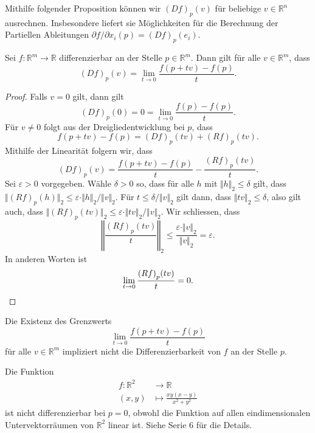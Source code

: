 \documentclass[../main.tex]{subfiles}
\begin{document}
Mithilfe folgender Proposition können wir ${(Df)}_p(v)$ 
für beliebige $v \in \mathbb{R}^n$ ausrechnen.
Insbesondere liefert sie Möglichkeiten für die
Berechnung der Partiellen Ableitungen
$\partial f / \partial x_i (p) = {(Df)}_p(e_i)$.

\begin{proposition*}
  Sei $f \colon \mathbb{R}^m \to \mathbb{R}$ differenzierbar
  an der Stelle $p \in \mathbb{R}^m$.
  Dann gilt für alle $v \in \mathbb{R}^m$, dass
  \[
    {(Df)}_p(v) = \lim_{t \to 0}
    \frac{f(p + tv) - f(p)}{t}.
  \]
\end{proposition*}

\begin{proof}
  Falls $v = 0$ gilt, dann gilt
  \[
    {(Df)}_p(0) = 0 = \lim_{t \to 0} \frac{f(p) - f(p)}{t}.
  \]
  Für $v \neq 0$ folgt aus der Dreigliedentwicklung
  bei $p$, dass
  \[
    f(p + tv) - f(p)
    = {(Df)}_p(tv) + {(Rf)}_p(tv).
  \]
  Mithilfe der Linearität folgern wir, dass
  \[
    {(Df)}_p(v) = \frac{f(p + tv) - f(p)}{t} - \frac{{(Rf)}_p(tv)}{t}.
  \]
  Sei $\varepsilon > 0$ vorgegeben. Wähle $\delta > 0$ 
  so, dass für alle $h$ mit $\Vert h \Vert_2 \leq \delta$ 
  gilt, dass $\Vert {(Rf)}_p(h) \Vert_2 \leq \varepsilon \cdot
  \Vert h \Vert_2 / \Vert v \Vert_2$.
  Für $t \leq \delta / \Vert v \Vert_2$ gilt dann,
  dass $\Vert tv \Vert_2 \leq \delta$,
  also gilt auch, dass
  $\Vert {(Rf)}_p (tv) \Vert_2 \leq \varepsilon 
  \cdot \Vert t v \Vert_2 /\Vert v \Vert_2$.
  Wir schliessen, dass
  \[
    \left\Vert \frac{{(Rf)}_p(tv)}{t} \right\Vert_2
    \leq \frac{\varepsilon \cdot \Vert v \Vert_2}{\Vert v \Vert_2} 
    = \varepsilon.
  \]
  In anderen Worten ist
  \[
    \lim_{t \to 0} \frac{{(Rf)}_p(tv)}{t} = 0. \qedhere
  \]
\end{proof}

\begin{remark}
  Die Existenz des Grenzwerts
  \[
    \lim_{t \to 0} \frac{f(p + tv) - f(p)}{t}
  \]
  für alle $v \in \mathbb{R}^m$ impliziert nicht
  die Differenzierbarkeit von $f$ an der Stelle $p$.
\end{remark}

\begin{example}
  Die Funktion
  \begin{align*}
    f \colon \mathbb{R}^2 & \to \mathbb{R} \\
    (x, y) & \mapsto \frac{xy(x-y)}{x^2 + y^2}
  \end{align*}
  ist nicht differenzierbar bei $p = 0$,
  obwohl die Funktion auf allen eindimensionalen Untervektorräumen
  von $\mathbb{R}^2$ linear ist.
  Siehe Serie 6 für die Details.
\end{example}
\end{document}
